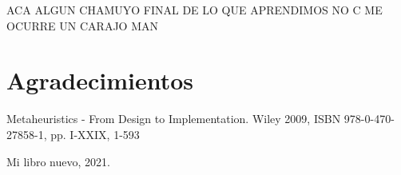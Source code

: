 \documentclass[10pt]{article}
\begin{document}
ACA ALGUN CHAMUYO FINAL DE LO QUE APRENDIMOS NO C ME OCURRE UN CARAJO MAN  
\section*{Agradecimientos}



\begin{thebibliography}{99} %

Metaheuristics - From Design to Implementation. Wiley 2009, ISBN 978-0-470-27858-1, pp. I-XXIX, 1-593

 Mi libro nuevo, 2021.

\end{thebibliography} 
\appendix %
 
\end{document}
